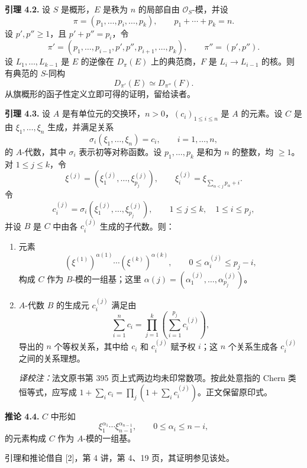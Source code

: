 \textbf{引理 4.2.} 设 \(S\) 是概形，\(E\) 是秩为 \(n\) 的局部自由 \(\mathcal O_S\)-模，并设
\[
  \pi=(p_1,\ldots,p_i,\ldots,p_k),\qquad p_1+\cdots+p_k=n.
\]
设 \(p',p''\geq 1\)，且 \(p'+p''=p_i\)，令
\[
  \pi'=(p_1,\ldots,p_{i-1},p',p'',p_{i+1},\ldots,p_k),
  \qquad \pi''=(p',p'').
\]
设 \(L_1,\ldots,L_{k-1}\) 是 \(E\) 的逆像在 \(D_\pi(E)\) 上的典范商，\(F\) 是 \(L_i\to L_{i-1}\) 的核。则有典范的 \(S\)-同构
\[
  D_{\pi'}(E)\simeq D_{\pi''}(F).
\]
从旗概形的函子性定义立即可得的证明，留给读者。

\textbf{引理 4.3.} 设 \(A\) 是有单位元的交换环，\(n>0\)，\((c_i)_{1\leq i\leq n}\) 是 \(A\) 的元素。设 \(C\) 是由 \(\xi_1,\ldots,\xi_n\) 生成，并满足关系
\[
  \sigma_i(\xi_1,\ldots,\xi_n)=c_i,
  \qquad i=1,\ldots,n,
\]
的 \(A\)-代数，其中 \(\sigma_i\) 表示初等对称函数。设 \(p_1,\ldots,p_k\) 是和为 \(n\) 的整数，均 \(\geq 1\)。对 \(1\leq j\leq k\)，令
\[
  \xi^{(j)}=(\xi^{(j)}_1,\ldots,\xi^{(j)}_{p_j}),
  \qquad
  \xi_i^{(j)}=\xi_{\sum_{\alpha<j}p_\alpha+i}.
\]
令
\[
  c_i^{(j)}=\sigma_i(\xi^{(j)}_1,\ldots,\xi^{(j)}_{p_j}),
  \qquad 1\leq j\leq k,
  \quad 1\leq i\leq p_j,
\]
并设 \(B\) 是 \(C\) 中由各 \(c_i^{(j)}\) 生成的子代数。则：

\begin{enumerate}[label=\textup{\roman*)}]
\item 元素
\[
  (\xi^{(1)})^{\alpha(1)}\cdots(\xi^{(k)})^{\alpha(k)},
  \qquad 0\leq \alpha_i^{(j)}\leq p_j-i,
\]
构成 \(C\) 作为 \(B\)-模的一组基；这里 \(\alpha(j)=(\alpha_1^{(j)},\ldots,\alpha_{p_j}^{(j)})\)。
\item \(A\)-代数 \(B\) 的生成元 \(c_i^{(j)}\) 满足由
\[
  \sum_{i=1}^n c_i
  =
  \prod_{j=1}^{k}\left(\sum_{i=1}^{p_j} c_i^{(j)}\right),
\]
导出的 \(n\) 个等权关系，其中给 \(c_i\) 和 \(c_i^{(j)}\) 赋予权 \(i\)；这 \(n\) 个关系生成各 \(c_i^{(j)}\) 之间的关系理想。\par\smallskip\noindent\textit{译校注：}法文原书第 395 页上式两边均未印常数项。按此处意指的 Chern 类恒等式，应写成 \(1+\sum_i c_i=\prod_j(1+\sum_i c_i^{(j)})\)。正文保留原印式。
\end{enumerate}

\textbf{推论 4.4.} \(C\) 中形如
\[
  \xi_1^{\alpha_1}\cdots \xi_{n-1}^{\alpha_{n-1}},
  \qquad 0\leq \alpha_i\leq n-i,
\]
的元素构成 \(C\) 作为 \(A\)-模的一组基。

引理和推论借自 [2]，第 4 讲，第 4、19 页，其证明参见该处。

